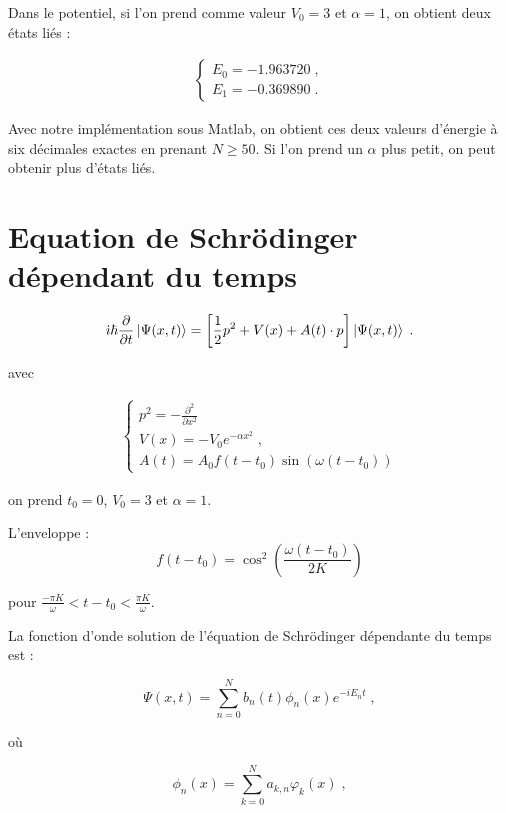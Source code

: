 \documentclass{report}
\begin{document}
Dans le potentiel, si l'on prend comme valeur $V_{0} = 3$ et $\alpha = 1$, on obtient deux états liés :

\begin{align}
\begin{cases}
E_{0} = -1.963720\;, \\
E_{1} = -0.369890\;.
\end{cases}
\end{align}

Avec notre implémentation sous Matlab, on obtient ces deux valeurs d'énergie à six décimales exactes en prenant $N \geq 50$. Si l'on prend un $\alpha$ plus petit, on peut obtenir plus d'états liés.

\section{Equation de Schrödinger dépendant du temps}

\begin{equation}\label{eq:schdt}
\dot{\imath}\hbar\frac{\partial}{\partial t}\ket{\Psi(x,t)}=\left[\frac{1}{2}p^2+ V(x)+A(t)\cdot p\right]\ket{\Psi(x,t)}\;.
\end{equation}

avec

\begin{align}
\begin{cases}
p^{2}=-\frac{\partial^2}{\partial x^{2}}\\
V(x)= -V_{0}e^{-\alpha x^{2}}\;, \\
A(t)= A_{0}f(t-t_{0})\sin(\omega (t-t_{0}))
  \end{cases}
\end{align}

on prend $t_{0}=0$, $V_{0} = 3$ et $\alpha = 1$.

L'enveloppe :
\begin{equation}
f(t-t_{0})=\cos^{2} \left(\frac{\omega (t-t_{0})}{2K}\right)
\end{equation}

pour $\frac{-\pi K}{\omega}<t-t_{0}<\frac{\pi K}{\omega}$.

La fonction d'onde solution de l'équation de Schrödinger dépendante du temps est :

\begin{equation}\label{psi_t}
\Psi(x,t)= \sum_{n=0}^N b_{n}(t)\phi_n(x) e^{-iE_{n}t}\;,
\end{equation}

où 

\begin{equation}
\phi_n(x)= \sum_{k=0}^N a_{k,n} \varphi_k(x)\;,
\end{equation}
\end{document}
